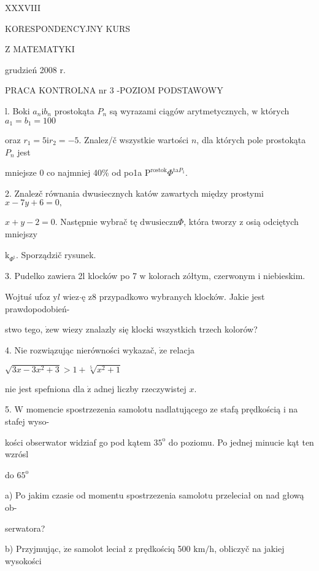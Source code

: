 \documentclass[a4paper,12pt]{article}
\begin{document}
XXXVIII

KORESPONDENCYJNY KURS

Z MATEMATYKI

grudzień 2008 r.

PRACA KONTROLNA nr 3 -POZIOM PODSTAWOWY

l. Boki $a_{n}\mathrm{i}b_{n}$ prostokąta $P_{n}$ są wyrazami ciągów arytmetycznych, $\mathrm{w}$ których $a_{1}=b_{1}=100$

oraz $r_{1}=5\mathrm{i}r_{2}=-5$. Znalez/č wszystkie wartości $n$, dla których pole prostokąta $P_{n}$ jest

mniejsze $0$ co najmniej 40\% od po1a $\mathrm{P}^{\mathrm{r}\mathrm{o}\mathrm{s}\mathrm{t}\mathrm{o}\mathrm{k}}\Phi^{\mathrm{t}\mathrm{a}P_{1}}.$

2. Znalez$\acute{}$č równania dwusiecznych katów zawartych między prostymi $x-7y+6 = 0,$

$x+y-2=0$. Następnie wybrač tę $\mathrm{d}\mathrm{w}\mathrm{u}\mathrm{s}\mathrm{i}\mathrm{e}\mathrm{c}\mathrm{z}\mathrm{n}\Phi$, która tworzy $\mathrm{z}$ osią odciętych mniejszy

$\mathrm{k}_{\Phi^{\mathrm{t}}}$. Sporządzič rysunek.

3. Pudelko zawiera 2l klocków po 7 $\mathrm{w}$ kolorach zółtym, czerwonym $\mathrm{i}$ niebieskim.

Wojtuś ufoz $\mathrm{y}l$ wiez$\cdot$ę $\mathrm{z}8$ przypadkowo wybranych klocków. Jakie jest prawdopodobień-

stwo tego, $\dot{\mathrm{z}}\mathrm{e}\mathrm{w}$ wiezy znalazly się klocki wszystkich trzech kolorów?

4. Nie rozwiązując nierówności wykazač, $\dot{\mathrm{z}}\mathrm{e}$ relacja

$\sqrt{3x-3x^{2}+3}>1+\sqrt[5]{x^{2}+1}$

nie jest spefniona dla $\dot{\mathrm{z}}$ adnej liczby rzeczywistej $x.$

5. $\mathrm{W}$ momencie spostrzezenia samolotu nadlatującego ze stafą prędkością $\mathrm{i}$ na stafej wyso-

kości obserwator widziaf go pod kątem $35^{\mathrm{o}}$ do poziomu. Po jednej minucie kąt ten wzrósl

do $65^{\mathrm{o}}$

a) Po jakim czasie od momentu spostrzezenia samolotu przeleciał on nad głową ob-

serwatora?

b) Przyjmując, $\dot{\mathrm{z}}\mathrm{e}$ samolot leciał $\mathrm{z}$ prędkościq 500 $\mathrm{k}\mathrm{m}/\mathrm{h}$, obliczyč na jakiej wysokości
\end{document}
